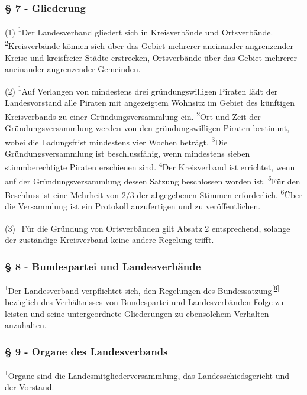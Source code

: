 \subsubsection{§ 7 - Gliederung}

(1) \textsuperscript{1}Der Landesverband gliedert sich in Kreisverbände
und Ortsverbände. \textsuperscript{2}Kreisverbände können sich über das
Gebiet mehrerer aneinander angrenzender Kreise und kreisfreier Städte
erstrecken, Ortsverbände über das Gebiet mehrerer aneinander
angrenzender Gemeinden.

(2) \textsuperscript{1}Auf Verlangen von mindestens drei
gründungswilligen Piraten lädt der Landesvorstand alle Piraten mit
angezeigtem Wohnsitz im Gebiet des künftigen Kreisverbands zu einer
Gründungsversammlung ein. \textsuperscript{2}Ort und Zeit der
Gründungsversammlung werden von den gründungswilligen Piraten bestimmt,
wobei die Ladungsfrist mindestens vier Wochen beträgt.
\textsuperscript{3}Die Gründungsversammlung ist beschlussfähig, wenn
mindestens sieben stimmberechtigte Piraten erschienen sind.
\textsuperscript{4}Der Kreisverband ist errichtet, wenn auf der
Gründungsversammlung dessen Satzung beschlossen worden ist.
\textsuperscript{5}Für den Beschluss ist eine Mehrheit von 2/3 der
abgegebenen Stimmen erforderlich. \textsuperscript{6}Über die
Versammlung ist ein Protokoll anzufertigen und zu veröffentlichen.

(3) \textsuperscript{1}Für die Gründung von Ortsverbänden gilt Absatz 2
entsprechend, solange der zuständige Kreisverband keine andere Regelung
trifft.

\subsubsection{§ 8 - Bundespartei und Landesverbände}

\textsuperscript{1}Der Landesverband verpflichtet sich, den Regelungen
des Bundessatzung\textsuperscript{\href{\#cite\_note-5}{{[}6{]}}}
bezüglich des Verhältnisses von Bundespartei und Landesverbänden Folge
zu leisten und seine untergeordnete Gliederungen zu ebensolchem
Verhalten anzuhalten.

\subsubsection{§ 9 - Organe des Landesverbands}

\textsuperscript{1}Organe sind die Landesmitgliederversammlung, das
Landesschiedsgericht und der Vorstand.

